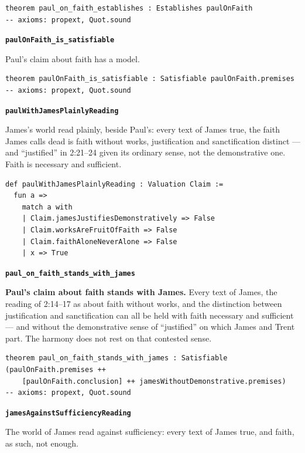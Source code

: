 \documentclass[11pt,paper=\testimonypaper,DIV=13,parskip=false]{scrartcl}
\begin{document}
{\small\begin{verbatim}
theorem paul_on_faith_establishes : Establishes paulOnFaith
-- axioms: propext, Quot.sound
\end{verbatim}}
\par\medskip\noindent\textbf{\texttt{paul\allowbreak{}On\allowbreak{}Faith\_\allowbreak{}is\_\allowbreak{}satisfiable}}\par\nobreak\noindent
Paul’s claim about faith has a model.

{\small\begin{verbatim}
theorem paulOnFaith_is_satisfiable : Satisfiable paulOnFaith.premises
-- axioms: propext, Quot.sound
\end{verbatim}}
\par\medskip\noindent\textbf{\texttt{paul\allowbreak{}With\allowbreak{}James\allowbreak{}Plainly\allowbreak{}Reading}}\par\nobreak\noindent
James’s world read plainly, beside Paul’s: every text of James true, the faith James calls dead is faith without works, justification and sanctification distinct — and “justified” in 2:21–24 given its ordinary sense, not the demonstrative one. Faith is necessary and sufficient.

{\small\begin{verbatim}
def paulWithJamesPlainlyReading : Valuation Claim :=
  fun a =>
    match a with
    | Claim.jamesJustifiesDemonstratively => False
    | Claim.worksAreFruitOfFaith => False
    | Claim.faithAloneNeverAlone => False
    | x => True
\end{verbatim}}
\par\medskip\noindent\textbf{\texttt{paul\_\allowbreak{}on\_\allowbreak{}faith\_\allowbreak{}stands\_\allowbreak{}with\_\allowbreak{}james}}\par\nobreak\noindent
\textbf{Paul’s claim about faith stands with James.} Every text of James, the reading of 2:14–17 as about faith without works, and the distinction between justification and sanctification can all be held with faith necessary and sufficient — and without the demonstrative sense of “justified” on which James and Trent part. The harmony does not rest on that contested sense.

{\small\begin{verbatim}
theorem paul_on_faith_stands_with_james : Satisfiable (paulOnFaith.premises ++
    [paulOnFaith.conclusion] ++ jamesWithoutDemonstrative.premises)
-- axioms: propext, Quot.sound
\end{verbatim}}
\par\medskip\noindent\textbf{\texttt{james\allowbreak{}Against\allowbreak{}Sufficiency\allowbreak{}Reading}}\par\nobreak\noindent
The world of James read against sufficiency: every text of James true, and faith, as such, not enough.
\end{document}
